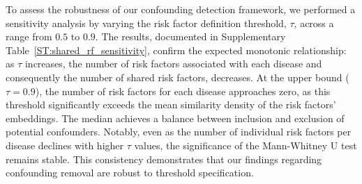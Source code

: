 To assess the robustness of our confounding detection framework, we performed a sensitivity analysis by varying the risk factor definition threshold, $\tau$, across a range from $0.5$ to $0.9$. The results, documented in Supplementary Table~\ref{ST:shared_rf_sensitivity}, confirm the expected monotonic relationship: as $\tau$ increases, the number of risk factors associated with each disease and consequently the number of shared risk factors, decreases. At the upper bound ($\tau = 0.9$), the number of risk factors for each disease approaches zero, as this threshold significantly exceeds the mean similarity density of the risk factors' embeddings. The median achieves a balance between inclusion and exclusion of potential confounders. Notably, even as the number of individual risk factors per disease declines with higher $\tau$ values, the significance of the Mann-Whitney U test remains stable. This consistency demonstrates that our findings regarding confounding removal are robust to threshold specification. 


